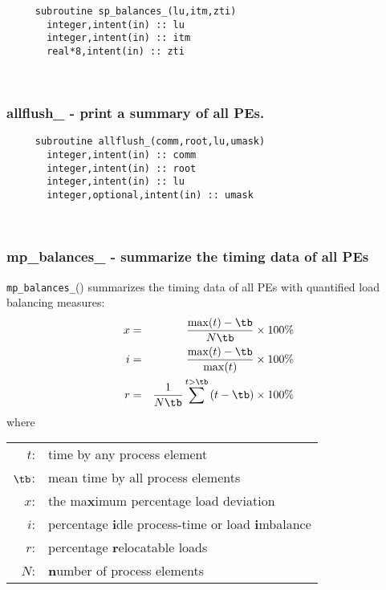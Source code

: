 \begin{verbatim} 
     subroutine sp_balances_(lu,itm,zti)
       integer,intent(in) :: lu
       integer,intent(in) :: itm
       real*8,intent(in) :: zti
 \end{verbatim}%
 
 
\mbox{}\hrulefill\ 
 
  \subsubsection{allflush\_ - print a summary of all PEs.}

\begin{verbatim} 
     subroutine allflush_(comm,root,lu,umask)
       integer,intent(in) :: comm
       integer,intent(in) :: root
       integer,intent(in) :: lu
       integer,optional,intent(in) :: umask
 \end{verbatim}%
 
 
\mbox{}\hrulefill\ 
 
  \subsubsection{mp\_balances\_ - summarize the timing data of all PEs}

  
  	\verb"mp_balances_"() summarizes the timing data of all PEs
     with quantified load balancing measures:
     \begin{eqnarray*}
  	x &=& \frac{\max(t) - \tb}{N\tb}	\times 100\%	\\
  	i &=& \frac{\max(t) - \tb}{\max(t)}	\times 100\%	\\
  	r &=& \frac{1}{N\tb} \sum^{t>\tb}{(t-\tb)}
  		\times 100\%
     \end{eqnarray*}
     where
     \begin{center}
       \begin{tabular}{rl}
         $t$: & time by any process element			\\
       $\tb$: & mean time by all process elements		\\
  	$x$: & the ma{\bf x}imum percentage load deviation	\\
  	$i$: & percentage {\bf i}dle process-time or
  					load {\bf i}mbalance	\\
  	$r$: & percentage {\bf r}elocatable loads		\\
  	$N$: & {\bf n}umber of process elements
       \end{tabular}
     \end{center}
  
